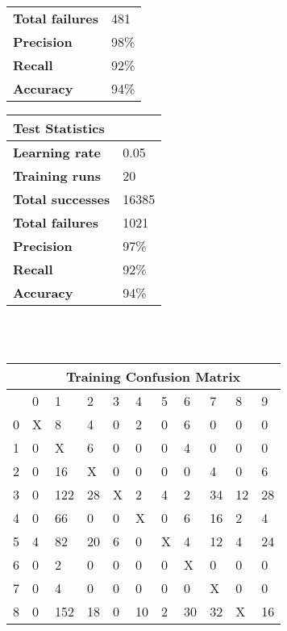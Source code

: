 \documentclass[titlepage,11pt]{article}
\begin{document}
{\begin{tabular}{l|l}
        \textbf{Total failures}&        481\\
        \textbf{Precision}&             98\%\\
        \textbf{Recall}&                92\%\\
        \textbf{Accuracy}&              94\%\\
        \end{tabular}
        \begin{tabular}{l|l}
        \textbf{Test Statistics}&\\
        \hline
        \textbf{Learning rate}&         0.05\\
        \textbf{Training runs}&         20\\
        \textbf{Total successes}&       16385\\
        \textbf{Total failures}&        1021\\
        \textbf{Precision}&             97\%\\
        \textbf{Recall}&                92\%\\
        \textbf{Accuracy}&              94\%\\
        \end{tabular}\\
        \vspace{2pt}\\
        \begin{tabular}{|l|llllllllll|}
        \hline
        &\multicolumn{10}{c|}{\textbf{Training Confusion Matrix}}\\
        \hline
        &     0&   1&   2&   3&   4&   5&   6&   7&   8&   9\\
        \hline
        0&    X&   8&   4&   0&   2&   0&   6&   0&   0&   0\\
        1&    0&   X&   6&   0&   0&   0&   4&   0&   0&   0\\
        2&    0&  16&   X&   0&   0&   0&   0&   4&   0&   6\\
        3&    0& 122&  28&   X&   2&   4&   2&  34&  12&  28\\
        4&    0&  66&   0&   0&   X&   0&   6&  16&   2&   4\\
        5&    4&  82&  20&   6&   0&   X&   4&  12&   4&  24\\
        6&    0&   2&   0&   0&   0&   0&   X&   0&   0&   0\\
        7&    0&   4&   0&   0&   0&   0&   0&   X&   0&   0\\
        8&    0& 152&  18&   0&  10&   2&  30&  32&   X&  16\\

\end{tabular}}
\end{document}
